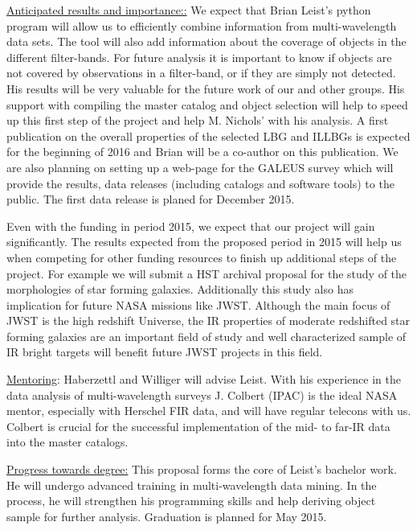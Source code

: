 \documentclass[12pt]{article}
\begin{document}
\hspace{0.1in}
\underline{Anticipated results and importance::} We expect that Brian
Leist's python 
program will allow us to efficiently combine information from
multi-wavelength data sets. The tool will also add information about
the coverage of objects in the different filter-bands. For future
analysis it is important to know if objects are not covered by
observations in a filter-band, or if they are simply not detected. 
His results will be very valuable for the future work of our and other
groups. His support with compiling the master catalog and object
selection will help to speed up this first step of the project and
help M. Nichols' with his analysis.
A first publication on the overall properties of the
selected LBG and ILLBGs is expected for the beginning of 2016 and
Brian will be a co-author on this publication. We are also planning on
setting up a web-page for the GALEUS survey which will provide the
results, data releases (including catalogs and software tools) to the
public. The first data release is planed for December 2015. 

Even with the funding in period 2015, we expect that our
project will gain significantly. The results expected from the
proposed period in 2015 will help us when competing for other funding
resources to finish up additional steps of the project. For example we
will submit a HST archival proposal for the study of the morphologies
of star forming galaxies.
Additionally this study also has implication for future NASA missions
like JWST. Although the main focus of JWST is the high redshift
Universe, the IR properties of moderate redshifted star forming
galaxies are an important field of study and well characterized sample
of IR bright targets will benefit future JWST projects in this field. 


\hspace{0.1in}
\underline{Mentoring}: Haberzettl and Williger will advise Leist.
With his experience in the data analysis of multi-wavelength surveys
J. Colbert (IPAC) is the ideal NASA mentor, especially with Herschel
FIR data, and will have regular telecons with us.  Colbert 
is crucial for the successful implementation of the mid- to far-IR
data into the master catalogs. 



\hspace{0.1in}
\underline{Progress towards degree:} This proposal forms
the core of Leist's bachelor work. He will undergo advanced training
in multi-wavelength data mining. In the process, he will strengthen
his programming skills and help deriving object sample for further
analysis. Graduation is planned for May 2015.
\end{document}
